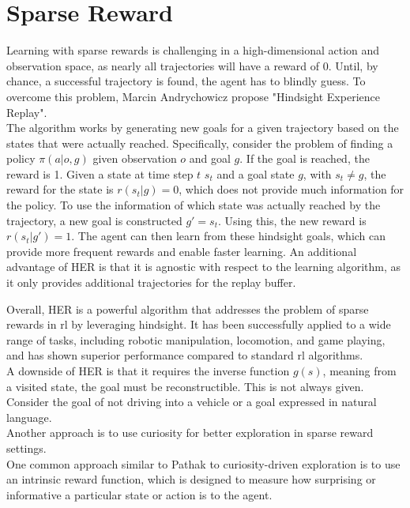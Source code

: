 \section{Sparse Reward}
\label{sec:HER}
Learning with sparse rewards is challenging in a high-dimensional action and observation space, as nearly all trajectories will have a reward of 0.
Until, by chance, a successful trajectory is found, the agent has to blindly guess. To overcome this problem, Marcin Andrychowicz \etAl \cite{andrychowicz2018hindsight} 
propose "Hindsight Experience Replay".\\

The algorithm works by generating new goals for a given trajectory based on the states that were actually reached.
Specifically, consider the problem of finding a policy $\pi(a|o, g)$ given observation $o$ and goal $g$.
If the goal is reached, the reward is 1. Given a state at time step $t$ $s_t$ and a goal state $g$, with $s_t \neq g$,
the reward for the state is $r(s_t|g) = 0$, which does not provide much information for the policy.
To use the information of which state was actually reached by the trajectory, a new goal is constructed $g' = s_t$. Using this, the new reward is $r(s_t|g') = 1$.
The agent can then learn from these hindsight goals, which can provide more frequent rewards and enable faster learning. An additional advantage of HER is that it is agnostic with respect to the learning algorithm, as it only provides additional trajectories for the replay buffer.

Overall, HER is a powerful algorithm that addresses the problem of sparse rewards in \ac{rl} by leveraging hindsight. It has been successfully applied to a wide range of tasks, 
including robotic manipulation, locomotion, and game playing, and has shown superior performance compared to standard \ac{rl} algorithms.\\

A downside of HER is that it requires the inverse function $g(s)$, meaning from a visited state, the goal must be reconstructible. This is not always given.
Consider the goal of not driving into a vehicle or a goal expressed in natural language. \\

Another approach is to use curiosity for better exploration in sparse reward settings.\\

One common approach similar to Pathak \etAl \cite{pathak2017curiositydriven} to curiosity-driven exploration is to use an intrinsic reward function, which is designed to 
measure how surprising or informative a particular 
state or action is to the agent. \\

